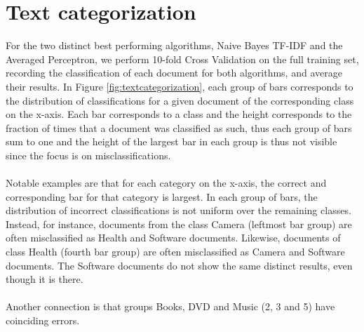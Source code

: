 \section{Text categorization}
For the two distinct best performing algorithms, Naive Bayes TF-IDF and the Averaged Perceptron, we perform 10-fold Cross Validation on the full training set, recording the classification of each document for both algorithms, and average their results. In Figure \ref{fig:textcategorization}, each group of bars corresponds to the distribution of classifications for a given document of the corresponding class on the x-axis. Each bar corresponds to a class and the height corresponds to the fraction of times that a document was classified as such, thus each group of bars sum to one and the height of the largest bar in each group is thus not visible since the focus is on misclassifications.
\\\\
Notable examples are that for each category on the x-axis, the correct and corresponding bar for that category is largest. In each group of bars, the distribution of incorrect classifications is not uniform over the remaining classes. Instead, for instance, documents from the class Camera (leftmost bar group) are often misclassified as Health and Software documents. Likewise, documents of class Health (fourth bar group) are often misclassified as Camera and Software documents. The Software documents do not show the same distinct results, even though it is there.
\\\\
Another connection is that groups Books, DVD and Music (2, 3 and 5) have coinciding errors.\\\\\\\\\\\\\\\\
